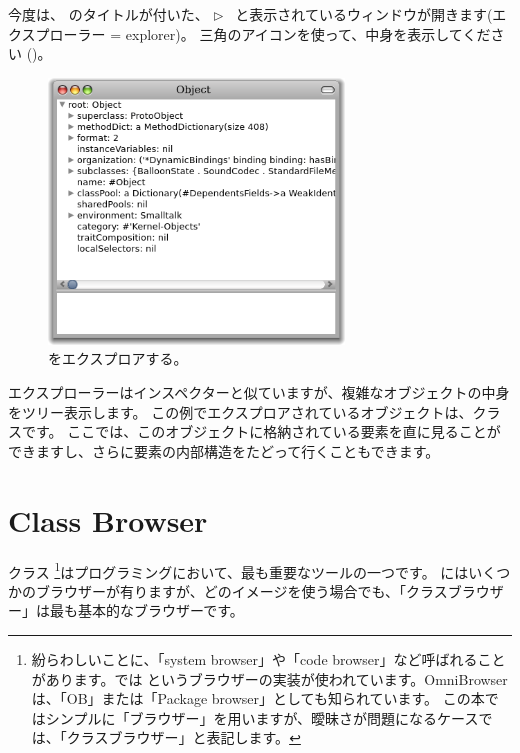 \documentclass[a4paper,10pt,twoside]{book}
\begin{document}


今度は、 のタイトルが付いた、
\mbox{$\triangleright$ } と表示されているウィンドウが開きます(エクスプローラー = explorer)。
三角のアイコンを使って、中身を表示してください ()。

\begin{figure}[htb]
\centerline {\includegraphics[width=0.7\textwidth]{ExploreIt}}
\caption{をエクスプロアする。}
\end{figure}

エクスプローラーはインスペクターと似ていますが、複雑なオブジェクトの中身をツリー表示します。
この例でエクスプロアされているオブジェクトは、クラスです。
ここでは、このオブジェクトに格納されている要素を直に見ることができますし、さらに要素の内部構造をたどって行くこともできます。

\section{Class Browser}

クラス \footnote{紛らわしいことに、「system browser」や「code browser」など呼ばれることがあります。\pharo では というブラウザーの実装が使われています。OmniBrowserは、「OB」または「Package browser」としても知られています。
この本ではシンプルに「ブラウザー」を用いますが、曖昧さが問題になるケースでは、「クラスブラウザー」と表記します。}はプログラミングにおいて、最も重要なツールの一つです。
\pharo にはいくつかのブラウザーが有りますが、どのイメージを使う場合でも、「クラスブラウザー」は最も基本的なブラウザーです。
\end{document}

